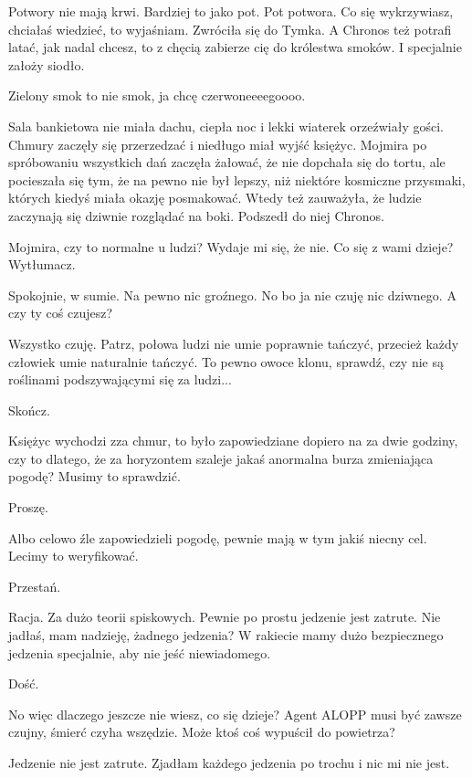 \ds{} Potwory nie mają krwi. Bardziej to jako pot. Pot potwora. Co się wykrzywiasz, chciałaś wiedzieć, to wyjaśniam. \dm{} Zwróciła się do Tymka. \dm{}
A Chronos też potrafi latać, jak nadal chcesz, to z chęcią zabierze cię do królestwa smoków. I specjalnie założy siodło. \de{}

\ds{} Zielony smok to nie smok, ja chcę czerwoneeeegoooo. \de{}

\divider{}

Sala bankietowa nie miała dachu, ciepła noc i lekki wiaterek orzeźwiały gości.
Chmury zaczęły się przerzedzać i niedługo miał wyjść księżyc.
Mojmira po spróbowaniu wszystkich dań zaczęła żałować, że nie dopchała się do tortu, ale pocieszała się tym, 
że na pewno nie był lepszy, niż niektóre kosmiczne przysmaki, których kiedyś miała okazję posmakować.
Wtedy też zauważyła, że ludzie zaczynają się dziwnie rozglądać na boki. 
Podszedł do niej Chronos.

\ds{} Mojmira, czy to normalne u ludzi? Wydaje mi się, że nie. Co się z wami dzieje? Wytłumacz. \de{}

\ds{} Spokojnie, w sumie. Na pewno nic groźnego. No bo ja nie czuję nic dziwnego. A czy ty coś czujesz? \de{}

\ds{} Wszystko czuję. Patrz, połowa ludzi nie umie poprawnie tańczyć, przecież każdy człowiek umie naturalnie tańczyć.
To pewno owoce klonu, sprawdź, czy nie są roślinami podszywającymi się za ludzi... \de{}

\ds{} Skończ. \de{}

\ds{} Księżyc wychodzi zza chmur, to było zapowiedziane dopiero na za dwie godziny, czy to dlatego, że za horyzontem szaleje jakaś anormalna burza zmieniająca pogodę? Musimy to sprawdzić. \de{}

\ds{} Proszę. \de{}

\ds{} Albo celowo źle zapowiedzieli pogodę, pewnie mają w tym jakiś niecny cel. Lecimy to weryfikować. \de{}

\ds{} Przestań. \de{}

\ds{} Racja. Za dużo teorii spiskowych. Pewnie po prostu jedzenie jest zatrute. Nie jadłaś, mam nadzieję, żadnego jedzenia? 
W rakiecie mamy dużo bezpiecznego jedzenia specjalnie, aby nie jeść niewiadomego. \de{}

\ds{} Dość. 

\ds{} No więc dlaczego jeszcze nie wiesz, co się dzieje? 
Agent ALOPP musi być zawsze czujny, śmierć czyha wszędzie. Może ktoś coś wypuścił do powietrza? \de{}

\ds{} Jedzenie nie jest zatrute. Zjadłam każdego jedzenia po trochu i nic mi nie jest. \de{}

